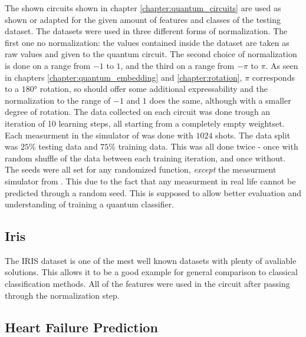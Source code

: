 The shown circuits shown in chapter \ref{chapter:quantum_circuits} are used as shown or adapted for the given amount of features and classes of the testing dataset. The datasets were used in three different forms of normalization. The first one no normalization: the values contained inside the dataset are taken as raw values and given to the quantum circuit. The second choice of normalization is done on a range from $-1$ to $1$, and the third on a range from $-\pi$ to $\pi$. As seen in chapters \ref{chapter:quantum_embedding} and \ref{chapter:rotation}, $\pi$ corresponds to a $180°$ rotation, so should offer some additional expressability and the normalization to the range of $-1$ and $1$ does the same, although with a smaller degree of rotation. The data collected on each circuit was done trough an iteration of 10 learning steps, all starting from a completely empty weightset. Each measurment in the simulator of  was done with $1024$ shots. The data split was $25\%$ testing data and $75\%$ training data. This was all done twice - once with random shuffle of the data between each training iteration, and once without. The seeds were all set for any randomized function, \emph{except} the measurment simulator from . This due to the fact that any measurment in real life cannot be predicted through a random seed. This is supposed to allow better evaluation and understanding of training a quantum classifier.


\subsection{Iris}
\label{chapter:iris}

The IRIS \cite{fisher_use_1936} dataset is one of the mest well known datasets with plenty of avaliable solutions. This allows it to be a good example for general comparison to classical classification methods. All of the features were used in the circuit after passing through the normalization step.

\subsection{Heart Failure Prediction}
\label{chapter:heart_failure_prediction}

